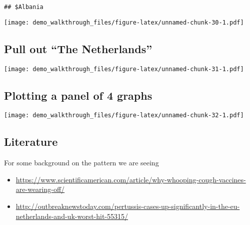 \documentclass[]{article}
\newenvironment{Shaded}{\begin{snugshade}}{\end{snugshade}}
\newcommand{\KeywordTok}[1]{\textcolor[rgb]{0.13,0.29,0.53}{\textbf{#1}}}
\newcommand{\DecValTok}[1]{\textcolor[rgb]{0.00,0.00,0.81}{#1}}
\newcommand{\StringTok}[1]{\textcolor[rgb]{0.31,0.60,0.02}{#1}}
\newcommand{\OperatorTok}[1]{\textcolor[rgb]{0.81,0.36,0.00}{\textbf{#1}}}
\newcommand{\NormalTok}[1]{#1}
\providecommand{\tightlist}{%
  \setlength{\itemsep}{0pt}\setlength{\parskip}{0pt}}
\begin{document}
\begin{Shaded}
\end{Shaded}

\begin{verbatim}
## $Albania
\end{verbatim}

\texttt{[image: demo\_walkthrough\_files/figure-latex/unnamed-chunk-30-1.pdf]}

\subsection{\texorpdfstring{Pull out ``The
Netherlands''}{Pull out The Netherlands}}\label{pull-out-the-netherlands}

\begin{Shaded}
\end{Shaded}

\texttt{[image: demo\_walkthrough\_files/figure-latex/unnamed-chunk-31-1.pdf]}

\subsection{Plotting a panel of 4
graphs}\label{plotting-a-panel-of-4-graphs}

\texttt{[image: demo\_walkthrough\_files/figure-latex/unnamed-chunk-32-1.pdf]}

\subsection{Literature}\label{literature}

For some background on the pattern we are seeing

\begin{itemize}
\tightlist
\item
  \url{https://www.scientificamerican.com/article/why-whooping-cough-vaccines-are-wearing-off/}
\item
  \url{http://outbreaknewstoday.com/pertussis-cases-up-significantly-in-the-eu-netherlands-and-uk-worst-hit-55315/}
\end{itemize}
\end{document}
